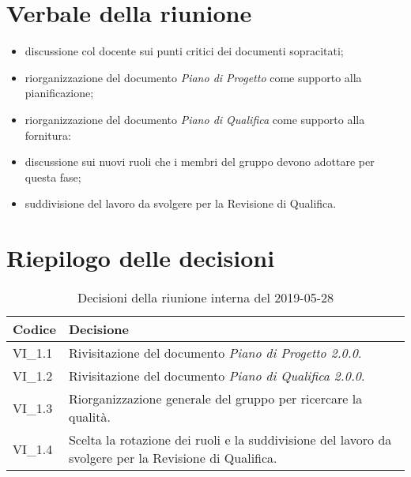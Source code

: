\section{Verbale della riunione}
\begin{itemize}
	\item discussione col docente sui punti critici dei documenti sopracitati;
	\item riorganizzazione del documento \textit{Piano di Progetto} come supporto alla pianificazione;
	\item riorganizzazione del documento \textit{Piano di Qualifica} come supporto alla fornitura:
	\item discussione sui nuovi ruoli che i membri del gruppo devono adottare per questa fase;
	\item suddivisione del lavoro da svolgere per la Revisione di Qualifica.

\end{itemize} 
\pagebreak
\section{Riepilogo delle decisioni}

	
	\begin{longtable}{ >{\centering}p{} >{}p{}}
		\caption{Decisioni della riunione interna del 2019-05-28}\\	
		\rowcolorhead
		\textbf{\color{white}Codice} 
		& \centering\textbf{\color{white}Decisione} 
		\tabularnewline 
		\endfirsthead
		VI\_1.1 & Rivisitazione del documento \textit{Piano di Progetto 2.0.0}.
		
		\tabularnewline 
		VI\_1.2 & Rivisitazione del documento \textit{Piano di Qualifica 2.0.0}.
		
		\tabularnewline 
		VI\_1.3 & Riorganizzazione generale del gruppo per ricercare la qualità.
		
		\tabularnewline 
		VI\_1.4 & Scelta la rotazione dei ruoli e la suddivisione del lavoro da svolgere per la Revisione di Qualifica.
	
	\end{longtable}
	





